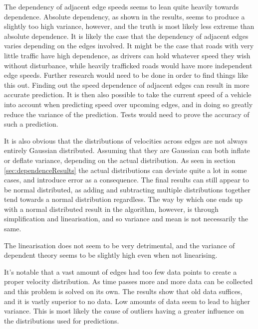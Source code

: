 \documentclass{article}
\begin{document}
		The dependency of adjacent edge speeds seems to lean quite heavily towards dependence. Absolute dependency, as shown in the results, seems to produce a slightly too high variance, however, and the truth is most likely less extreme than absolute dependence. It is likely the case that the dependency of adjacent edges varies depending on the edges involved. It might be the case that roads with very little traffic have high dependence, as drivers can hold whatever speed they wish without disturbance, while heavily trafficked roads would have more independent edge speeds. Further research would need to be done in order to find things like this out. Finding out the speed dependence of adjacent edges can result in more accurate prediction. It is then also possible to take the current speed of a vehicle into account when predicting speed over upcoming edges, and in doing so greatly reduce the variance of the prediction. Tests would need to prove the accuracy of such a prediction.

		It is also obvious that the distributions of velocities across edges are not always entirely Gaussian distributed. Assuming that they are Gaussian can both inflate or deflate variance, depending on the actual distribution. As seen in section \ref{sec:dependenceResults} the actual distributions can deviate quite a lot in some cases, and introduce error as a consequence. The final results can still appear to be normal distributed, as adding and subtracting multiple distributions together tend towards a normal distribution regardless. The way by which one ends up with a normal distributed result in the algorithm, however, is through simplification and linearisation, and so variance and mean is not necessarily the same.

		The linearisation does not seem to be very detrimental, and the variance of dependent theory seems to be slightly high even when not linearising.

		It's notable that a vast amount of edges had too few data points to create a proper velocity distribution. As time passes more and more data can be collected and this problem is solved on its own. The results show that old data suffices, and it is vastly superior to no data. Low amounts of data seem to lead to higher variance. This is most likely the cause of outliers having a greater influence on the distributions used for predictions.
\end{document}
